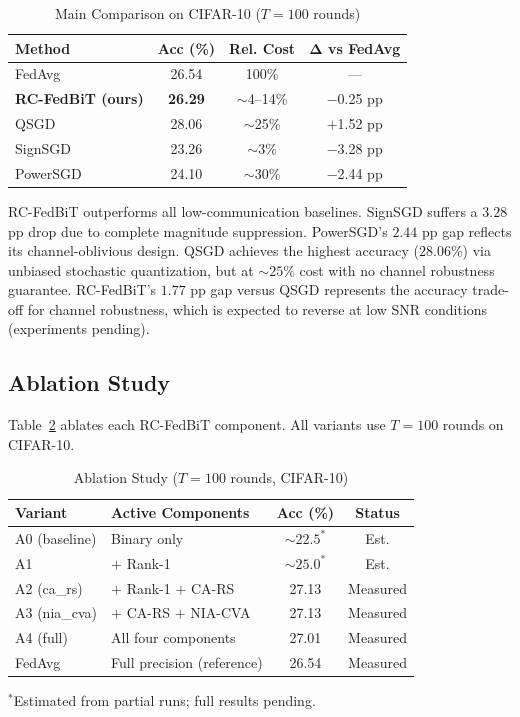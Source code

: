 \documentclass[conference]{IEEEtran}
\begin{document}
\begin{table}[h]
\centering
\caption{Main Comparison on CIFAR-10 ($T=100$ rounds)}
\label{tab:main}
\begin{tabular}{lccc}
\toprule
\textbf{Method} & \textbf{Acc (\%)} & \textbf{Rel. Cost} & $\boldsymbol{\Delta}$ \textbf{vs FedAvg} \\
\midrule
FedAvg~\cite{mcmahan2017communication} & 26.54 & 100\% & --- \\
\textbf{RC-FedBiT (ours)} & \textbf{26.29} & $\sim$4--14\% & $-$0.25 pp \\
QSGD~\cite{alistarh2017qsgd} & 28.06 & $\sim$25\% & $+$1.52 pp \\
SignSGD~\cite{bernstein2018signsgd} & 23.26 & $\sim$3\% & $-$3.28 pp \\
PowerSGD~\cite{vogels2019powersgd} & 24.10 & $\sim$30\% & $-$2.44 pp \\
\bottomrule
\end{tabular}
\end{table}

RC-FedBiT outperforms all low-communication baselines. SignSGD suffers a $3.28$ pp drop due to complete magnitude suppression. PowerSGD's $2.44$ pp gap reflects its channel-oblivious design. QSGD achieves the highest accuracy ($28.06\%$) via unbiased stochastic quantization, but at $\sim\!25\%$ cost with no channel robustness guarantee. RC-FedBiT's $1.77$ pp gap versus QSGD represents the accuracy trade-off for channel robustness, which is expected to reverse at low SNR conditions (experiments pending).

\subsection{Ablation Study}

Table~\ref{tab:ablation} ablates each RC-FedBiT component. All variants use $T=100$ rounds on CIFAR-10.

\begin{table}[h]
\centering
\caption{Ablation Study ($T=100$ rounds, CIFAR-10)}
\label{tab:ablation}
\begin{tabular}{llcc}
\toprule
\textbf{Variant} & \textbf{Active Components} & \textbf{Acc (\%)} & \textbf{Status} \\
\midrule
A0 (baseline) & Binary only & ${\sim}22.5^*$ & Est. \\
A1 & $+$ Rank-1 & ${\sim}25.0^*$ & Est. \\
A2 (ca\_rs) & $+$ Rank-1 $+$ CA-RS & 27.13 & Measured \\
A3 (nia\_cva) & $+$ CA-RS $+$ NIA-CVA & 27.13 & Measured \\
A4 (full) & All four components & 27.01 & Measured \\
\midrule
FedAvg & Full precision (reference) & 26.54 & Measured \\
\bottomrule
\end{tabular}
\small{$^*$Estimated from partial runs; full results pending.}
\end{table}
\end{document}
